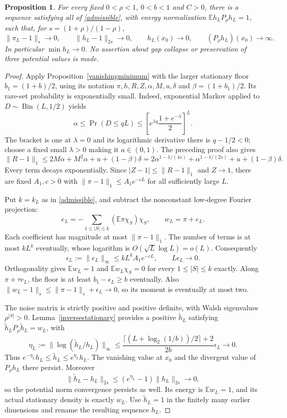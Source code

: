 \documentclass[11pt]{article}
\newcommand{\E}{\mathbb E}
\newtheorem{proposition}[theorem]{Proposition}
\begin{document}
\begin{proposition}\label{exactvanishingminimum}
For every fixed $0<\rho<1$, $0<b<1$ and $C>0$, there is a sequence
satisfying all of \eqref{admissible}, with energy normalization
$\E h_LP_\rho h_L=1$, such that, for $s=(1+\rho)/(1-\rho)$,
\[
 \|\pi_L-1\|_s\to0,\qquad \|h_L-1\|_{2s}\to0,\qquad
 h_L(x_0)\to0,\qquad (P_\rho h_L)(x_0)\to\infty.
\]
In particular $\min h_L\to0$. No assertion about gap collapse or
preservation of three potential values is made.
\end{proposition}
\begin{proof}
Apply Proposition~\ref{vanishingminimum} with the larger stationary
floor $b_1=(1+b)/2$, using its notation $\pi,h,R,Z,\alpha,M,u,\delta$
and $\beta=(1+b_1)/2$.
Its rare-set probability is exponentially small. Indeed, exponential
Markov applied to $D\sim\operatorname{Bin}(L,1/2)$ yields
\[
 \alpha\leq\Pr(D\leq qL)
 \leq\left[e^{\lambda q}\frac{1+e^{-\lambda}}2\right]^L.
\]
The bracket is one at $\lambda=0$ and its logarithmic derivative there
is $q-1/2<0$; choose a fixed small $\lambda>0$ making it $a\in(0,1)$.
The preceding proof also gives
\[
 \|R-1\|_1\leq2M\alpha+M^2\alpha+u+(1-\beta)\delta
 =2\alpha^{1-1/(4s)}+\alpha^{1-1/(2s)}+u+(1-\beta)\delta.
\]
Every term decays exponentially. Since $|Z-1|\leq\|R-1\|_1$ and
$Z\to1$, there are fixed $A_1,c>0$ with
$\|\pi-1\|_1\leq A_1e^{-cL}$ for all sufficiently large $L$.

Put $k=k_L$ as in \eqref{admissible}, and subtract the nonconstant
low-degree Fourier projection:
\[
 e_L=-\sum_{1\leq|S|\leq k}(\E\pi\chi_S)\chi_S,\qquad
 w_L=\pi+e_L.
\]
Each coefficient has magnitude at most $\|\pi-1\|_1$. The number of
terms is at most $kL^k$ eventually, whose logarithm is
$O(\sqrt L\log L)=o(L)$. Consequently
\[
 \epsilon_L:=\|e_L\|_\infty\leq kL^k A_1e^{-cL},\qquad
 L\epsilon_L\to0.
\]
Orthogonality gives $\E w_L=1$ and $\E w_L\chi_S=0$ for every
$1\leq|S|\leq k$ exactly. Along $\pi+\tau e_L$, the floor is at
least $b_1-\epsilon_L\geq b$ eventually. Also
$\|w_L-1\|_s\leq\|\pi-1\|_s+\epsilon_L\to0$, so its moment
is eventually at most two.

The noise matrix is strictly positive and positive definite, with
Walsh eigenvalues $\rho^{|S|}>0$. Lemma~\ref{inversestationary}
provides a positive $\widetilde h_L$ satisfying
$\widetilde h_L P_\rho\widetilde h_L=w_L$, with
\[
 \eta_L:=\|\log(\widetilde h_L/h_L)\|_\infty
 \leq\frac{\lceil (L+\log_2(1/b))/2\rceil+2}{2b}\epsilon_L\to0.
\]
Thus $e^{-\eta_L}h_L\leq\widetilde h_L\leq e^{\eta_L}h_L$.
The vanishing value at $x_0$ and the divergent value of $P_\rho h_L$
there persist. Moreover
\[
 \|\widetilde h_L-h_L\|_{2s}
 \leq(e^{\eta_L}-1)\|h_L\|_{2s}\to0,
\]
so the potential norm convergence persists as well. Its energy is
$\E w_L=1$, and its actual stationary density is exactly $w_L$.
Use $\widetilde h_L=1$ in the finitely many earlier dimensions and
rename the resulting sequence $h_L$.
\end{proof}
\end{document}
